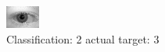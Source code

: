 \begin{figure}[h!]
\begin{center}
\includegraphics[width=0.60\columnwidth]{figures/ID634_class_2_target_3.png}
\end{center}
\caption{ Classification: 2 actual target: 3}
\label{fig:ID634_class_2_target_3}
\end{figure}
